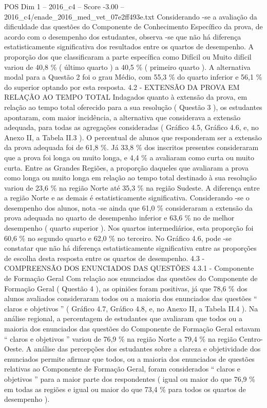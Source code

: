 \begin{textsample}{POS Dim 1 – 2016\_c4 – Score -3.00 – 2016\_c4/enade\_2016\_med\_vet\_07e2ff493e.txt}
Considerando -se a avaliação da dificuldade das questões do Componente de Conhecimento Específico da prova, de acordo com o desempenho dos estudantes, observa -se que não há diferença estatisticamente significativa dos resultados entre os quartos de desempenho.
A proporção dos que classificaram a parte específica como Difícil ou Muito difícil variou de 40,8 \% ( último quarto ) a 40,5 \% ( primeiro quarto ).
A alternativa modal para a Questão 2 foi o grau Médio, com 55,3 \% do quarto inferior e 56,1 \% do superior optando por esta resposta. 4.2 - EXTENSÃO DA PROVA EM RELAÇÃO AO TEMPO TOTAL Indagados quanto à extensão da prova, em relação ao tempo total oferecido para a sua resolução ( Questão 3 ), os estudantes apontaram, com maior incidência, a alternativa que considerava a extensão adequada, para todas as agregações consideradas ( Gráfico 4.5, Gráfico 4.6, e, no Anexo II, a Tabela II.3 ).
O percentual de alunos que responderam ser a extensão da prova adequada foi de 61,8 \%.
Já 33,8 \% dos inscritos presentes consideraram que a prova foi longa ou muito longa, e 4,4 \% a avaliaram como curta ou muito curta.
Entre as Grandes Regiões, a proporção daqueles que avaliaram a prova como longa ou muito longa em relação ao tempo total destinado à sua resolução variou de 23,6 \% na região Norte até 35,3 \% na região Sudeste.
A diferença entre a região Norte e as demais é estatisticamente significativa.
Considerando -se o desempenho dos alunos, nota -se ainda que 61,0 \% consideraram a extensão da prova adequada no quarto de desempenho inferior e 63,6 \% no de melhor desempenho ( quarto superior ).
Nos quartos intermediários, esta proporção foi 60,6 \% no segundo quarto e 62,0 \% no terceiro.
No Gráfico 4.6, pode -se constatar que não há diferença estatisticamente significativa entre as proporções de escolha desta resposta entre os quartos de desempenho. 4.3 - COMPREENSÃO DOS ENUNCIADOS DAS QUESTÕES 4.3.1 - Componente de Formação Geral Com relação aos enunciados das questões do Componente de Formação Geral ( Questão 4 ), as opiniões foram positivas, já que 78,6 \% dos alunos avaliados consideraram todos ou a maioria dos enunciados das questões “ claros e objetivos ” ( Gráfico 4.7, Gráfico 4.8, e, no Anexo II, a Tabela II.4 ).
Na análise regional, a percentagem de estudantes que avaliaram que todos ou a maioria dos enunciados das questões do Componente de Formação Geral estavam “ claros e objetivos ” variou de 76,9 \% na região Norte a 79,4 \% na região Centro-Oeste.
A análise das percepções dos estudantes sobre a clareza e objetividade dos enunciados permite afirmar que todos, ou a maioria dos enunciados de questões relativas ao Componente de Formação Geral, foram considerados “ claros e objetivos ” para a maior parte dos respondentes ( igual ou maior do que 76,9 \% em todas as regiões e igual ou maior do que 73,4 \% para todos os quartos de desempenho ).

\end{textsample}

